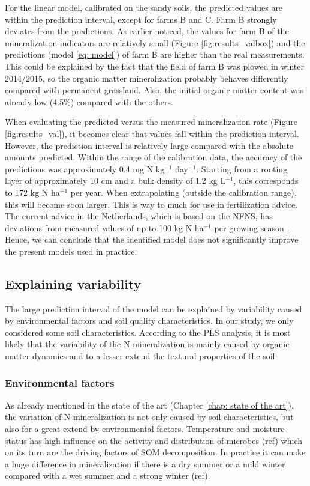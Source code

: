\documentclass[10pt,twoside,dutch,english]{report}
\begin{document}
For the linear model, calibrated on the sandy soils, the predicted values are within the prediction interval, except for farms B and C. Farm B strongly deviates from the predictions. As earlier noticed, the values for farm B of the mineralization indicators are relatively small (Figure \ref{fig:results_valbox}) and the predictions (model \ref{eq: model}) of farm B are higher than the real measurements. This could be explained by the fact that the field of farm B was plowed in winter 2014/2015, so the organic matter mineralization probably behaves differently compared with permanent grassland. Also, the initial organic matter content was already low (4.5\%) compared with the others. 


When evaluating the predicted versus the measured mineralization rate (Figure \ref{fig:results_val}), it becomes clear that values fall within the prediction interval. However, the prediction interval is relatively large compared with the absolute amounts predicted.
Within the range of the calibration data, the accuracy of the predictions was approximately 0.4 mg N kg$^{-1}$ day$^{-1}$. Starting from a rooting layer of approximately 10 cm and a bulk density of 1.2 kg L$^{-1}$, this corresponds to 172  kg N ha$^{-1}$ per year. When extrapolating (outside the calibration range), this will become soon larger. This is way to much for use in fertilization advice. The current advice in the Netherlands, which is based on the NFNS, has deviations from measured values of up to 100 kg N ha$^{-1}$ per growing season \citep{Ros2015}. Hence, we can conclude that the identified model does not significantly improve the present models used in practice. 






\subsection{Explaining variability}
The large prediction interval of the model can be explained by variability caused by environmental factors and soil quality characteristics. In our study, we only considered some soil characteristics. According to the PLS analysis, it is most likely that the variability of the N mineralization is mainly caused by organic matter dynamics and to a lesser extend the textural properties of the soil. 
\subsubsection{Environmental factors}
    As already mentioned in the state of the art (Chapter \ref{chap: state of the art}), the variation of N mineralization is not only caused by soil characteristics, but also for a great extend by environmental factors. Temperature and moisture status has high influence on the activity and distribution of microbes (ref) which on its turn are the driving factors of SOM decomposition. 
In practice it can make a huge difference in mineralization if there is a dry summer or a mild winter compared with a wet summer and a strong winter (ref). 
\end{document}
